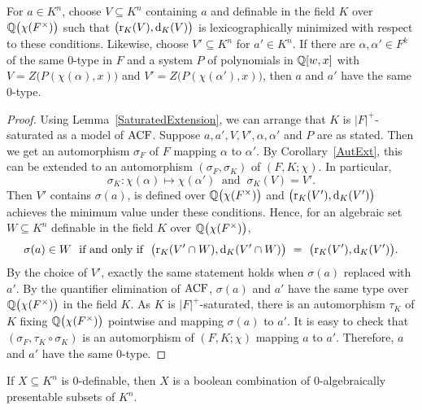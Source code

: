 \begin{lem}\label{QuanRedLem}
For $a \in K^n$, choose $V \subseteq K^n$ containing $a$ and definable in the field $K$ over $ \mathbb{Q}\big( \chi(F^\times)\big) $  such that $\big(\mathrm{r}_K(V), \mathrm{d}_K(V)\big)$ is lexicographically minimized with respect to these conditions. Likewise, choose $V'\subseteq K^n$ for $a' \in K^n$.
If there are $ \alpha, \alpha' \in F^k$ of the same $0$-type in $F$ and a system $P$ of polynomials in $\mathbb{Q}[w,x]$  with $ V = Z\big(P( \chi( \alpha), x) \big)  $ and $V' =Z\big(P( \chi( \alpha'), x) \big)$, then  $ a$ and $a'$ have the same $0$-type.
\end{lem}

\begin{proof}
Using Lemma~\ref{SaturatedExtension}, we can arrange that $ K$ is $ |F|^{+}$-saturated as a model of $\mathrm{ACF}$. Suppose $a,a', V, V', \alpha, \alpha'$ and $P$ are as stated. Then we get an automorphism $\sigma_F$ of $F$ mapping $\alpha$ to $\alpha'$.
By Corollary~\ref{AutExt}, this can be extended to an automorphism  $ (\sigma_F, \sigma_K)$ of $ (F, K; \chi)$. In particular, 
$$\sigma_K: \chi(\alpha) \mapsto \chi(\alpha')\ \text{ and }\ \sigma_K(V) = V'.$$
Then $V'$ contains $\sigma(a)$, is defined over $ \mathbb{Q}\big( \chi(F^\times)\big) $ and $\big(\mathrm{r}_K(V'), \mathrm{d}_K(V')\big)$ achieves the minimum value under these conditions.
Hence, for an algebraic  set $W \subseteq K^n$ definable in the field $K$ over $ \mathbb{Q}\big( \chi(F^\times)\big) $, 
$$\sigma(a) \in W\ \text{ if and only if }\ \big(\mr_K(V'\cap W), \md_K(V' \cap W)\big)\ =\ \big(\mr_K(V'), \md_K(V')\big). $$
By the choice of $V'$, exactly the same statement holds when $\sigma(a)$ replaced with $a'$. 
By the quantifier elimination of $\mathrm{ACF}$, $ \sigma(a) $ and $ a'$ have the same type over $ \mathbb{Q}\big( \chi(F^\times)\big) $ in the field $K$.
As $ K$ is $ |F|^{+}$-saturated, there is an automorphism $\tau_K$ of $K$ fixing $\mathbb{Q}\big(\chi(F^\times)\big)$ pointwise and mapping $\sigma(a)$ to $a'$.
It is easy to check that $(\sigma_F, \tau_K \circ \sigma_K)$ is an automorphism of $(F, K; \chi)$ mapping $a$ to $a'$. Therefore, $a$ and $a'$ have the same $0$-type.
\end{proof}



\begin{thm} \label{QuanRed}
If $X \subseteq K^n$ is $0$-definable, then $X$ is a boolean combination of $0$-algebraically presentable subsets of $K^n$.  
\end{thm}

